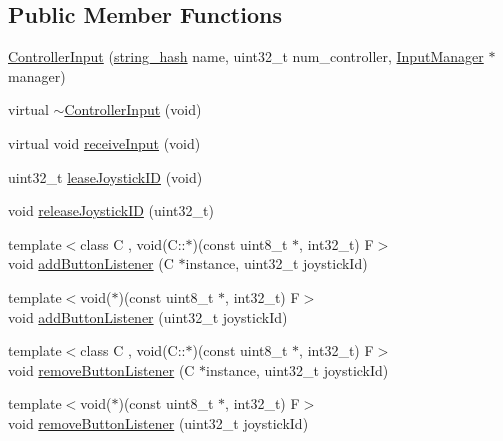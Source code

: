 \subsection*{Public Member Functions}
\begin{DoxyCompactItemize}
\item 
\hyperlink{classcrap_1_1_controller_input_af34426e64eac9f9a4125e355009d478a}{Controller\+Input} (\hyperlink{classcrap_1_1string__hash}{string\+\_\+hash} name, uint32\+\_\+t num\+\_\+controller, \hyperlink{classcrap_1_1_input_manager}{Input\+Manager} $\ast$manager)
\item 
virtual \hyperlink{classcrap_1_1_controller_input_a6873e43ba5c70aba109880a5857248da}{$\sim$\+Controller\+Input} (void)
\item 
virtual void \hyperlink{classcrap_1_1_controller_input_a1bc99bce625553885a1b7ad221289b7a}{receive\+Input} (void)
\item 
uint32\+\_\+t \hyperlink{classcrap_1_1_controller_input_ab7cc1802c47296476ab44b12ca2460c4}{lease\+Joystick\+I\+D} (void)
\item 
void \hyperlink{classcrap_1_1_controller_input_a1d19ac50e2cf5feba32cc394508cd900}{release\+Joystick\+I\+D} (uint32\+\_\+t)
\item 
{\footnotesize template$<$class C , void(\+C\+::$\ast$)(const uint8\+\_\+t $\ast$, int32\+\_\+t) F$>$ }\\void \hyperlink{classcrap_1_1_controller_input_af3394f5ba021545f55fcdc1ae4f3a6f4}{add\+Button\+Listener} (C $\ast$instance, uint32\+\_\+t joystick\+Id)
\item 
{\footnotesize template$<$void($\ast$)(const uint8\+\_\+t $\ast$, int32\+\_\+t) F$>$ }\\void \hyperlink{classcrap_1_1_controller_input_afb768eb9f127d55c7a85a42cd82b9529}{add\+Button\+Listener} (uint32\+\_\+t joystick\+Id)
\item 
{\footnotesize template$<$class C , void(\+C\+::$\ast$)(const uint8\+\_\+t $\ast$, int32\+\_\+t) F$>$ }\\void \hyperlink{classcrap_1_1_controller_input_a52d14324d3d71969c726b2ebcf0e9e03}{remove\+Button\+Listener} (C $\ast$instance, uint32\+\_\+t joystick\+Id)
\item 
{\footnotesize template$<$void($\ast$)(const uint8\+\_\+t $\ast$, int32\+\_\+t) F$>$ }\\void \hyperlink{classcrap_1_1_controller_input_a27bdbd9fa874df597d845fd2a8352f3f}{remove\+Button\+Listener} (uint32\+\_\+t joystick\+Id)
\item 

\end{DoxyCompactItemize}
